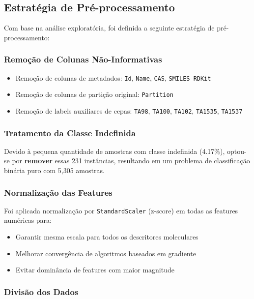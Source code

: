 \documentclass[12pt,a4paper]{article}
\begin{document}
\subsection{Estratégia de Pré-processamento}

Com base na análise exploratória, foi definida a seguinte estratégia de pré-processamento:

\subsubsection{Remoção de Colunas Não-Informativas}

\begin{itemize}
    \item Remoção de colunas de metadados: \texttt{Id}, \texttt{Name}, \texttt{CAS}, \texttt{SMILES RDKit}
    \item Remoção de colunas de partição original: \texttt{Partition}
    \item Remoção de labels auxiliares de cepas: \texttt{TA98}, \texttt{TA100}, \texttt{TA102}, \texttt{TA1535}, \texttt{TA1537}
\end{itemize}

\subsubsection{Tratamento da Classe Indefinida}

Devido à pequena quantidade de amostras com classe indefinida (4.17\%), optou-se por \textbf{remover} essas 231 instâncias, resultando em um problema de classificação binária puro com 5,305 amostras.

\subsubsection{Normalização das Features}

Foi aplicada normalização por \texttt{StandardScaler} (z-score) em todas as features numéricas para:

\begin{itemize}
    \item Garantir mesma escala para todos os descritores moleculares
    \item Melhorar convergência de algoritmos baseados em gradiente
    \item Evitar dominância de features com maior magnitude
\end{itemize}

\subsubsection{Divisão dos Dados}
\end{document}
